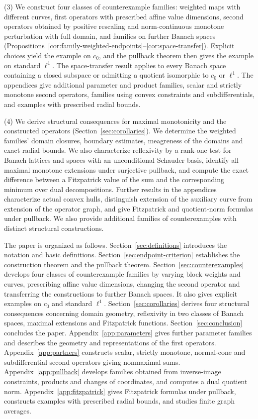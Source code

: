 \documentclass[11pt]{article}
\theoremstyle{definition}
\theoremstyle{remark}
\begin{document}
(3) We construct four classes of counterexample families: weighted maps with different curves, first operators with prescribed affine value dimensions, second operators obtained by positive rescaling and norm-continuous monotone perturbation with full domain, and families on further Banach spaces (Propositions~\ref{cor:family-weighted-endpoints}--\ref{cor:space-transfer}). Explicit choices yield the example on $c_0$, and the pullback theorem then gives the example on standard $\ell^1$. The space-transfer result applies to every Banach space containing a closed subspace or admitting a quotient isomorphic to $c_0$ or $\ell^1$. The appendices give additional parameter and product families, scalar and strictly monotone second operators, families using convex constraints and subdifferentials, and examples with prescribed radial bounds. 

(4) We derive structural consequences for maximal monotonicity and the constructed operators (Section~\ref{sec:corollaries}). We determine the weighted families' domain closures, boundary estimates, meagreness of the domains and exact radial bounds. We also characterize reflexivity by a rank-one test for Banach lattices and spaces with an unconditional Schauder basis, identify all maximal monotone extensions under surjective pullback, and compute the exact difference between a Fitzpatrick value of the sum and the corresponding minimum over dual decompositions. Further results in the appendices characterize actual convex hulls, distinguish extension of the auxiliary curve from extension of the operator graph, and give Fitzpatrick and quotient-norm formulas under pullback. We also provide additional families of counterexamples with distinct structural constructions. 

The paper is organized as follows. Section~\ref{sec:definitions} introduces the notation and basic definitions. Section~\ref{sec:endpoint-criterion} establishes the construction theorem and the pullback theorem. Section~\ref{sec:counterexamples} develops four classes of counterexample families by varying block weights and curves, prescribing affine value dimensions, changing the second operator and transferring the constructions to further Banach spaces. It also gives explicit examples on $c_0$ and standard $\ell^1$. Section~\ref{sec:corollaries} derives four structural consequences concerning domain geometry, reflexivity in two classes of Banach spaces, maximal extensions and Fitzpatrick functions. Section~\ref{sec:conclusion} concludes the paper. Appendix~\ref{app:parameters} gives further parameter families and describes the geometry and representations of the first operators. Appendix~\ref{app:partners} constructs scalar, strictly monotone, normal-cone and subdifferential second operators giving nonmaximal sums. Appendix~\ref{app:pullback} develops families obtained from inverse-image constraints, products and changes of coordinates, and computes a dual quotient norm. Appendix~\ref{app:fitzpatrick} gives Fitzpatrick formulas under pullback, constructs examples with prescribed radial bounds, and studies finite graph averages. 
\end{document}
